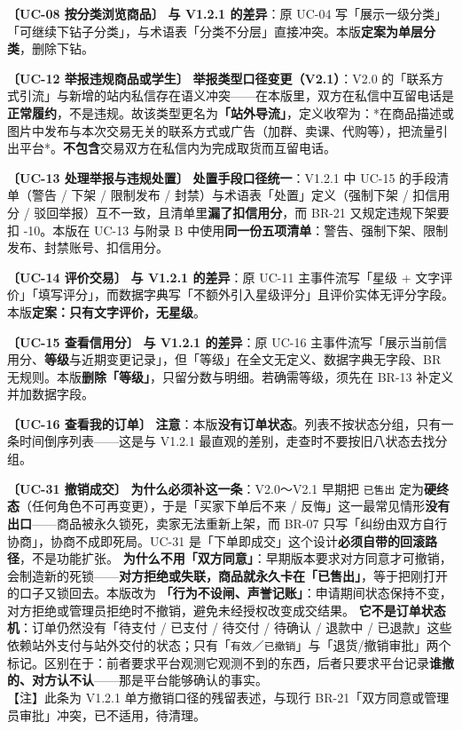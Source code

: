 \documentclass[12pt,a4paper]{ctexart}
\begin{document}
{\small\textbf{〔UC-08 按分类浏览商品〕} \textbf{与 V1.2.1 的差异}：原 UC-04 写「展示一级分类」「可继续下钻子分类」，与术语表「分类不分层」直接冲突。本版\textbf{定案为单层分类}，删除下钻。}\par
\vspace{0.35em}
{\small\textbf{〔UC-12 举报违规商品或学生〕} \textbf{举报类型口径变更（V2.1）}：V2.0 的「联系方式引流」与新增的站内私信存在语义冲突——在本版里，双方在私信中互留电话是\textbf{正常履约}，不是违规。故该类型更名为\textbf{「站外导流」}，定义收窄为：*在商品描述或图片中发布与本次交易无关的联系方式或广告（加群、卖课、代购等），把流量引出平台*。\textbf{不包含}交易双方在私信内为完成取货而互留电话。}\par
\vspace{0.35em}
{\small\textbf{〔UC-13 处理举报与违规处置〕} \textbf{处置手段口径统一}：V1.2.1 中 UC-15 的手段清单（警告 / 下架 / 限制发布 / 封禁）与术语表「处置」定义（强制下架 / 扣信用分 / 驳回举报）互不一致，且清单里\textbf{漏了扣信用分}，而 BR-21 又规定违规下架要扣 -10。本版在 UC-13 与附录 B 中使用\textbf{同一份五项清单}：警告、强制下架、限制发布、封禁账号、扣信用分。}\par
\vspace{0.35em}
{\small\textbf{〔UC-14 评价交易〕} \textbf{与 V1.2.1 的差异}：原 UC-11 主事件流写「星级 + 文字评价」「填写评分」，而数据字典写「不额外引入星级评分」且评价实体无评分字段。本版\textbf{定案：只有文字评价，无星级}。}\par
\vspace{0.35em}
{\small\textbf{〔UC-15 查看信用分〕} \textbf{与 V1.2.1 的差异}：原 UC-16 主事件流写「展示当前信用分、\textbf{等级}与近期变更记录」，但「等级」在全文无定义、数据字典无字段、BR 无规则。本版\textbf{删除「等级」}，只留分数与明细。若确需等级，须先在 BR-13 补定义并加数据字段。}\par
\vspace{0.35em}
{\small\textbf{〔UC-16 查看我的订单〕} \textbf{注意}：本版\textbf{没有订单状态}。列表不按状态分组，只有一条时间倒序列表——这是与 V1.2.1 最直观的差别，走查时不要按旧八状态去找分组。}\par
\vspace{0.35em}
{\small\textbf{〔UC-31 撤销成交〕} \textbf{为什么必须补这一条}：V2.0～V2.1 早期把 \texttt{已售出} 定为\textbf{硬终态}（任何角色不可再变更），于是「买家下单后不来 / 反悔」这一最常见情形\textbf{没有出口}——商品被永久锁死，卖家无法重新上架，而 BR-07 只写「纠纷由双方自行协商」，协商不成即死局。UC-31 是「下单即成交」这个设计\textbf{必须自带的回滚路径}，不是功能扩张。 \textbf{为什么不用「双方同意」}：早期版本要求对方同意才可撤销，会制造新的死锁——\textbf{对方拒绝或失联，商品就永久卡在「已售出」}，等于把刚打开的口子又锁回去。本版改为 \textbf{「行为不设闸、声誉记账」}：申请期间状态保持不变，对方拒绝或管理员拒绝时不撤销，避免未经授权改变成交结果。 \textbf{它不是订单状态机}：订单仍然没有「待支付 / 已支付 / 待交付 / 待确认 / 退款中 / 已退款」这些依赖站外支付与站外交付的状态；只有「\texttt{有效}／\texttt{已撤销}」与「退货/撤销审批」两个标记。区别在于：前者要求平台观测它观测不到的东西，后者只要求平台记录\textbf{谁撤的、对方认不认}——那是平台能够确认的事实。 \\ {\footnotesize\color{gray}【注】此条为 V1.2.1 单方撤销口径的残留表述，与现行 BR-21「双方同意或管理员审批」冲突，已不适用，待清理。}}\par
\end{document}
